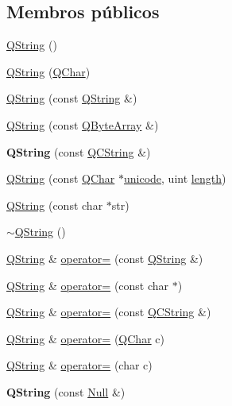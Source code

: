 \subsection*{Membros públicos}
\begin{DoxyCompactItemize}
\item 
\hyperlink{class_q_string_aeb800ad13815ba67746c8591df9e0ed9}{Q\-String} ()
\item 
\hyperlink{class_q_string_a944ed2a8cf72828068c78177e3fb2614}{Q\-String} (\hyperlink{class_q_char}{Q\-Char})
\item 
\hyperlink{class_q_string_a46b40a258d3e2e434114b6b7dc59f4ed}{Q\-String} (const \hyperlink{class_q_string}{Q\-String} \&)
\item 
\hyperlink{class_q_string_a03ece70f85dbcaa34e536cdb087620bc}{Q\-String} (const \hyperlink{class_q_array}{Q\-Byte\-Array} \&)
\item 
\hypertarget{class_q_string_accff8ce991aac3ae959a676f3a6e1de8}{{\bfseries Q\-String} (const \hyperlink{class_q_c_string}{Q\-C\-String} \&)}\label{class_q_string_accff8ce991aac3ae959a676f3a6e1de8}

\item 
\hyperlink{class_q_string_a5f1b101c1e8f83726d05756b90b487b6}{Q\-String} (const \hyperlink{class_q_char}{Q\-Char} $\ast$\hyperlink{class_q_string_a65a250696de2e5cb83a8e01a9603cea0}{unicode}, uint \hyperlink{class_q_string_ab0edbf251efc0562d70132e931e3cf06}{length})
\item 
\hyperlink{class_q_string_add0bac07acb536df7be191ab9959f709}{Q\-String} (const char $\ast$str)
\item 
\hyperlink{class_q_string_ae63f8e6e878c39e64cdf75258dc862fc}{$\sim$\-Q\-String} ()
\item 
\hyperlink{class_q_string}{Q\-String} \& \hyperlink{class_q_string_a073da1d0e9f2f6b894c5edd865fc12cd}{operator=} (const \hyperlink{class_q_string}{Q\-String} \&)
\item 
\hyperlink{class_q_string}{Q\-String} \& \hyperlink{class_q_string_aaa193932aa34a1b13c8fa0341092101f}{operator=} (const char $\ast$)
\item 
\hyperlink{class_q_string}{Q\-String} \& \hyperlink{class_q_string_a37774f73735421287b1fb7c3a48e445d}{operator=} (const \hyperlink{class_q_c_string}{Q\-C\-String} \&)
\item 
\hyperlink{class_q_string}{Q\-String} \& \hyperlink{class_q_string_a9d2aeb3e5dab20eefdbf7be3920033df}{operator=} (\hyperlink{class_q_char}{Q\-Char} c)
\item 
\hyperlink{class_q_string}{Q\-String} \& \hyperlink{class_q_string_a3223f3139f9b0b6c355fce5b349cb301}{operator=} (char c)
\item 
\hypertarget{class_q_string_a98a53ff2e23313a044c3fe7d5c85f0c5}{{\bfseries Q\-String} (const \hyperlink{struct_q_string_1_1_null}{Null} \&)}\label{class_q_string_a98a53ff2e23313a044c3fe7d5c85f0c5}


\end{DoxyCompactItemize}
